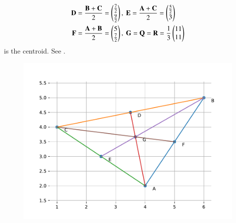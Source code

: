 \begin{align}
\mathbf{D}&=\frac{\mathbf{B}+\mathbf{C}}{2}
=\begin{pmatrix}\frac{7}{2}\\[2pt] \frac{9}{2}\end{pmatrix},\
\mathbf{E}=\frac{\mathbf{A}+\mathbf{C}}{2}
=\begin{pmatrix}\frac{5}{2}\\ 3\end{pmatrix}\\
\mathbf{F}&=\frac{\mathbf{A}+\mathbf{B}}{2}
=\begin{pmatrix}5\\ \frac{7}{2}\end{pmatrix}
,\
\mathbf{G}
	=\mathbf{Q}
=\mathbf{R}
=\frac{1}{3}\begin{pmatrix}11\\11\end{pmatrix}
\end{align} 
is the centroid.
See 
  .
\begin{figure}[H]
\centering
\includegraphics[width=0.75\columnwidth]{chapters/10/7/4/7/figs/fig.pdf}
\caption{}
  \label{fig:chapters/10/7/4/7/Figure}
\end{figure}
